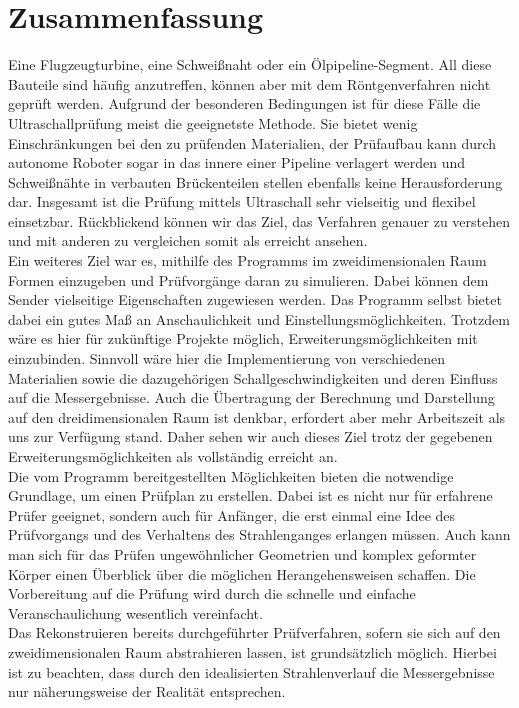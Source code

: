 \documentclass[reducespace,stylepage,semiarbeit]{spezidoc}
\begin{document}
\section{Zusammenfassung}
Eine Flugzeugturbine, eine Schweißnaht oder ein Ölpipeline-Segment.
All diese Bauteile sind häufig anzutreffen, können aber mit dem Röntgenverfahren nicht geprüft werden.
Aufgrund der besonderen Bedingungen ist für diese Fälle die Ultraschallprüfung meist die geeignetste Methode.
Sie bietet wenig Einschränkungen bei den zu prüfenden Materialien, der Prüfaufbau kann durch autonome Roboter sogar in das innere einer Pipeline verlagert werden und Schweißnähte in verbauten Brückenteilen stellen ebenfalls keine Herausforderung dar.
Insgesamt ist die Prüfung mittels Ultraschall sehr vielseitig und flexibel einsetzbar.
Rückblickend können wir das Ziel, das Verfahren genauer zu verstehen und mit anderen zu vergleichen somit als erreicht ansehen.\\
Ein weiteres Ziel war es, mithilfe des Programms im zweidimensionalen Raum Formen einzugeben und Prüfvorgänge daran zu simulieren. 
Dabei können dem Sender vielseitige Eigenschaften zugewiesen werden.
Das Programm selbst bietet dabei ein gutes Maß an Anschaulichkeit und Einstellungsmöglichkeiten.
Trotzdem wäre es hier für zukünftige Projekte möglich, Erweiterungsmöglichkeiten mit einzubinden.
Sinnvoll wäre hier die Implementierung von verschiedenen Materialien sowie die dazugehörigen 
Schallgeschwindigkeiten und deren Einfluss auf die Messergebnisse. Auch die Übertragung der Berechnung und Darstellung auf den dreidimensionalen Raum ist denkbar, erfordert aber mehr Arbeitszeit als uns zur Verfügung stand.
Daher sehen wir auch dieses Ziel trotz der gegebenen Erweiterungsmöglichkeiten als vollständig erreicht an.\\
Die vom Programm bereitgestellten Möglichkeiten bieten die notwendige Grundlage, um einen Prüfplan zu erstellen. 
Dabei ist es nicht nur für erfahrene Prüfer geeignet, sondern auch für Anfänger, die erst einmal eine Idee des Prüfvorgangs und des Verhaltens des Strahlenganges erlangen müssen.
Auch kann man sich für das Prüfen ungewöhnlicher Geometrien und komplex geformter Körper einen Überblick über die möglichen Herangehensweisen schaffen. Die Vorbereitung auf die Prüfung wird durch die schnelle und einfache Veranschaulichung wesentlich vereinfacht. \\
Das Rekonstruieren bereits durchgeführter Prüfverfahren, sofern sie sich auf den zweidimensionalen Raum abstrahieren lassen, ist grundsätzlich möglich. 
Hierbei ist zu beachten, dass durch den idealisierten Strahlenverlauf die Messergebnisse nur näherungsweise der Realität entsprechen.
\end{document}
